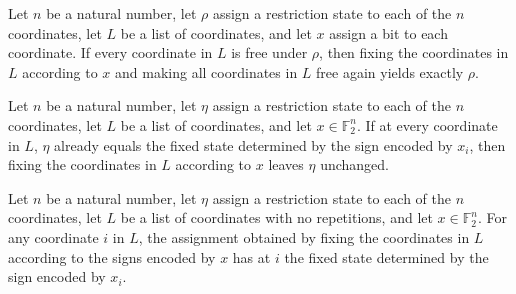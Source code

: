 \begin{theorem}
\label{FABL.CoordRestriction.freeCoordinateList_fixCoordinateList}
\leanok
{}
Let $n$ be a natural number, let $\rho$ assign a restriction state to each of the $n$
coordinates, let $L$ be a list of coordinates, and let $x$ assign a bit to each
coordinate. If every coordinate in $L$ is free under $\rho$, then fixing the coordinates
in $L$ according to $x$ and making all coordinates in $L$ free again yields exactly
$\rho$.
\end{theorem}

\begin{theorem}
\label{FABL.CoordRestriction.fixCoordinateList_eq_self}
\leanok
{}
Let $n$ be a natural number, let $\eta$ assign a restriction state to each of the $n$
coordinates, let $L$ be a list of coordinates, and let $x\in\mathbb{F}_2^n$. If at every
coordinate in $L$, $\eta$ already equals the fixed state determined by the sign encoded
by $x_i$, then fixing the coordinates in $L$ according to $x$ leaves $\eta$ unchanged.
\end{theorem}

\begin{theorem}
\label{FABL.CoordRestriction.fixCoordinateList_apply_of_mem}
\leanok
{}
Let $n$ be a natural number, let $\eta$ assign a restriction state to each of the $n$
coordinates, let $L$ be a list of coordinates with no repetitions, and let
$x\in\mathbb{F}_2^n$. For any coordinate $i$ in $L$, the assignment obtained by fixing
the coordinates in $L$ according to the signs encoded by $x$ has at $i$ the fixed state
determined by the sign encoded by $x_i$.
\end{theorem}

